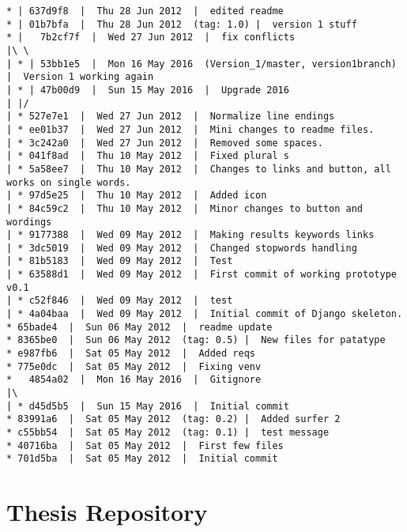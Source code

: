 \begin{verbatim}
* | 637d9f8  |  Thu 28 Jun 2012  |  edited readme
* | 01b7bfa  |  Thu 28 Jun 2012  (tag: 1.0) |  version 1 stuff
* |   7b2cf7f  |  Wed 27 Jun 2012  |  fix conflicts
|\ \  
| * | 53bb1e5  |  Mon 16 May 2016  (Version_1/master, version1branch) |  Version 1 working again
| * | 47b00d9  |  Sun 15 May 2016  |  Upgrade 2016
| |/  
| * 527e7e1  |  Wed 27 Jun 2012  |  Normalize line endings
| * ee01b37  |  Wed 27 Jun 2012  |  Mini changes to readme files.
| * 3c242a0  |  Wed 27 Jun 2012  |  Removed some spaces.
| * 041f8ad  |  Thu 10 May 2012  |  Fixed plural s
| * 5a58ee7  |  Thu 10 May 2012  |  Changes to links and button, all works on single words.
| * 97d5e25  |  Thu 10 May 2012  |  Added icon
| * 84c59c2  |  Thu 10 May 2012  |  Minor changes to button and wordings
| * 9177388  |  Wed 09 May 2012  |  Making results keywords links
| * 3dc5019  |  Wed 09 May 2012  |  Changed stopwords handling
| * 81b5183  |  Wed 09 May 2012  |  Test
| * 63588d1  |  Wed 09 May 2012  |  First commit of working prototype v0.1
| * c52f846  |  Wed 09 May 2012  |  test
| * 4a04baa  |  Wed 09 May 2012  |  Initial commit of Django skeleton.
* 65bade4  |  Sun 06 May 2012  |  readme update
* 8365be0  |  Sun 06 May 2012  (tag: 0.5) |  New files for patatype
* e987fb6  |  Sat 05 May 2012  |  Added reqs
* 775e0dc  |  Sat 05 May 2012  |  Fixing venv
*   4854a02  |  Mon 16 May 2016  |  Gitignore
|\  
| * d45d5b5  |  Sun 15 May 2016  |  Initial commit
* 83991a6  |  Sat 05 May 2012  (tag: 0.2) |  Added surfer 2
* c55bb54  |  Sat 05 May 2012  (tag: 0.1) |  test message
* 40716ba  |  Sat 05 May 2012  |  First few files
* 701d5ba  |  Sat 05 May 2012  |  Initial commit
\end{verbatim}


\section{Thesis Repository}

